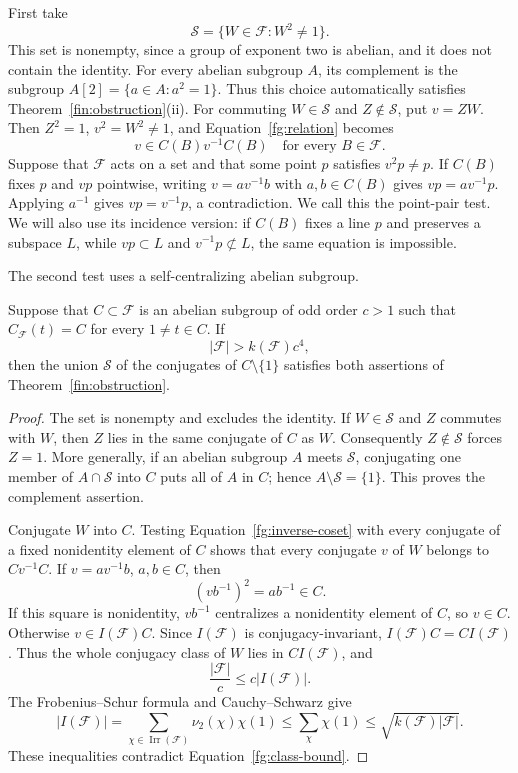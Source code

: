 First take
\begin{equation}\label{fg:square-set}
 \mathcal S=\{W\in\mathcal F:W^2\ne1\}.
\end{equation}
This set is nonempty, since a group of exponent two is abelian, and it
does not contain the identity. For every abelian subgroup $A$, its
complement is the subgroup $A[2]=\{a\in A:a^2=1\}$. Thus this choice
automatically satisfies Theorem~\ref{fin:obstruction}(ii). For commuting $W\in\mathcal S$ and
$Z\notin\mathcal S$, put $v=ZW$. Then $Z^2=1$, $v^2=W^2\ne1$, and
Equation~\eqref{fg:relation} becomes
\begin{equation}\label{fg:inverse-coset}
 v\in C(B)v^{-1}C(B)\quad\text{for every }B\in\mathcal F.
\end{equation}
Suppose that $\mathcal F$ acts on a set and that some point $p$ satisfies
$v^2p\ne p$. If $C(B)$ fixes $p$ and $vp$ pointwise, writing
$v=a v^{-1}b$ with $a,b\in C(B)$ gives
$vp=a v^{-1}p$. Applying $a^{-1}$ gives $vp=v^{-1}p$, a contradiction.
We call this the point-pair test. We will also use its incidence version:
if $C(B)$ fixes a line $p$ and preserves a subspace $L$, while $vp\subset L$
and $v^{-1}p\not\subset L$, the same equation is impossible.

The second test uses a self-centralizing abelian subgroup.
\begin{lemma}\label{fg:abelian-test}
Suppose that $C\subset\mathcal F$ is an abelian subgroup of odd order
$c>1$ such that $C_{\mathcal F}(t)=C$ for every $1\ne t\in C$. If
\begin{equation}\label{fg:class-bound}
 |\mathcal F|>k(\mathcal F)c^4,
\end{equation}
then the union $\mathcal S$ of the conjugates of $C\setminus\{1\}$
satisfies both assertions of Theorem~\ref{fin:obstruction}.
\end{lemma}
\begin{proof}
The set is nonempty and excludes the identity. If $W\in\mathcal S$ and
$Z$ commutes with $W$, then $Z$ lies in the same conjugate of $C$ as $W$.
Consequently $Z\notin\mathcal S$ forces $Z=1$. More generally,
if an abelian subgroup $A$ meets $\mathcal S$, conjugating one member of
$A\cap\mathcal S$ into $C$ puts all of $A$ in $C$; hence
$A\setminus\mathcal S=\{1\}$. This proves the complement assertion.

Conjugate $W$ into $C$. Testing Equation~\eqref{fg:inverse-coset}
with every conjugate of a fixed nonidentity element of $C$ shows that
every conjugate $v$ of $W$ belongs to $Cv^{-1}C$. If
$v=a v^{-1}b$, $a,b\in C$, then
\[
 (v b^{-1})^2=a b^{-1}\in C.
\]
If this square is nonidentity, $v b^{-1}$ centralizes a nonidentity
element of $C$, so $v\in C$. Otherwise $v\in I(\mathcal F)C$.
Since $I(\mathcal F)$ is conjugacy-invariant, $I(\mathcal F)C=CI(\mathcal F)$.
Thus the whole conjugacy class of $W$ lies in $CI(\mathcal F)$, and
\[
 \frac{|\mathcal F|}{c}\le c|I(\mathcal F)|.
\]
The Frobenius--Schur formula and Cauchy--Schwarz give
\[
 |I(\mathcal F)|
 =\sum_{\chi\in\operatorname{Irr}(\mathcal F)}\nu_2(\chi)\chi(1)
 \le\sum_\chi\chi(1)
 \le\sqrt{k(\mathcal F)|\mathcal F|}.
\]
These inequalities contradict Equation~\eqref{fg:class-bound}.
\end{proof}

